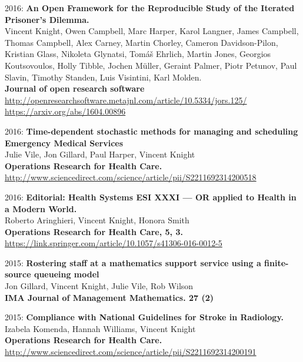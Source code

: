 \documentclass[10pt]{res} %
\begin{document}
\begin{resume}
\begin{etaremune}
\item
2016: \textbf{An Open Framework for the Reproducible Study of the Iterated Prisoner’s Dilemma.}\\
Vincent Knight, Owen Campbell, Marc Harper, Karol Langner, James Campbell, Thomas Campbell, Alex Carney, Martin Chorley, Cameron Davidson-Pilon, Kristian Glass, Nikoleta Glynatsi, Tomáš Ehrlich, Martin Jones, Georgios Koutsovoulos, Holly Tibble, Jochen Müller, Geraint Palmer, Piotr Petunov, Paul Slavin, Timothy Standen, Luis Visintini, Karl Molden.
\\
\textbf{Journal of open research software}
\\
\url{http://openresearchsoftware.metajnl.com/article/10.5334/jors.125/}
\\
\url{https://arxiv.org/abs/1604.00896}
\\

\item
2016: \textbf{Time-dependent stochastic methods for managing and scheduling Emergency Medical Services}\\
Julie Vile, Jon Gillard, Paul Harper, Vincent Knight
\\
\textbf{Operations Research for Health Care.}
\\
\url{http://www.sciencedirect.com/science/article/pii/S2211692314200518}
\\

\item
2016: \textbf{Editorial: Health Systems ESI XXXI — OR applied to Health in a Modern World.}\\
Roberto Aringhieri, Vincent Knight, Honora Smith
\\
\textbf{Operations Research for Health Care, 5, 3.}
\\
\url{https://link.springer.com/article/10.1057/s41306-016-0012-5}
\\

\item
2015: \textbf{Rostering staff at a mathematics support service using a finite-source queueing model}\\
Jon Gillard, Vincent Knight, Julie Vile, Rob Wilson
\\
\textbf{IMA Journal of Management Mathematics. 27 (2)}
\\

\item
2015: \textbf{Compliance with National Guidelines for Stroke in Radiology.}\\
Izabela Komenda, Hannah Williams, Vincent Knight
\\
\textbf{Operations Research for Health Care.}
\\
\url{http://www.sciencedirect.com/science/article/pii/S2211692314200191}
\\


\end{etaremune}
\end{resume}
\end{document}
